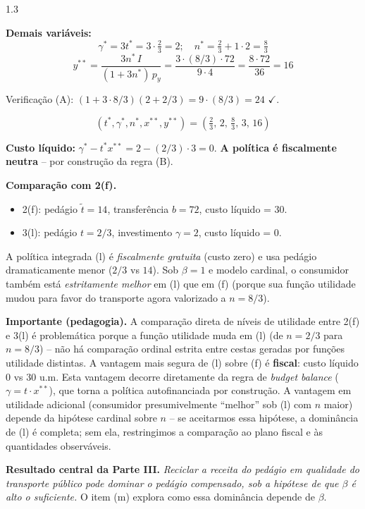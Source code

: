 \documentclass[11pt,addpoints]{exam}
\begin{document}
\begin{spacing}{1.3}
\begin{questions}
\begin{parts}
\begin{solution}
\textbf{Demais variáveis:}
\[
  \gamma^* = 3 t^* = 3\cdot \tfrac{2}{3} = 2; \quad n^* = \tfrac{2}{3} + 1\cdot 2 = \tfrac{8}{3}
\]
\[
  y^{**} = \frac{3 n^*\, I}{(1+3n^*)\, p_y} = \frac{3\cdot (8/3)\cdot 72}{9\cdot 4} = \frac{8\cdot 72}{36} = 16
\]

Verificação (A): $(1+3\cdot 8/3)(2 + 2/3) = 9\cdot (8/3) = 24$ $\checkmark$.

\[
  \boxed{(t^*, \gamma^*, n^*, x^{**}, y^{**}) = \left(\tfrac{2}{3},\,2,\,\tfrac{8}{3},\,3,\,16\right)}
\]

\textbf{Custo líquido:} $\gamma^* - t^* x^{**} = 2 - (2/3)\cdot 3 = 0$. \textbf{A política é fiscalmente neutra} -- por construção da regra (B).

\textbf{Comparação com 2(f).}
\begin{itemize}[noitemsep]
\item 2(f): pedágio $\tilde t = 14$, transferência $b=72$, custo líquido = 30.
\item 3(l): pedágio $t = 2/3$, investimento $\gamma=2$, custo líquido = 0.
\end{itemize}

A política integrada (l) é \textit{fiscalmente gratuita} (custo zero) e usa pedágio dramaticamente menor ($2/3$ vs $14$). Sob $\beta=1$ e modelo cardinal, o consumidor também está \textit{estritamente melhor} em (l) que em (f) (porque sua função utilidade mudou para favor do transporte agora valorizado a $n=8/3$).

\textbf{Importante (pedagogia).} A comparação direta de níveis de utilidade entre 2(f) e 3(l) é problemática porque a função utilidade muda em (l) (de $n=2/3$ para $n=8/3$) -- não há comparação ordinal estrita entre cestas geradas por funções utilidade distintas. A vantagem mais segura de (l) sobre (f) é \textbf{fiscal}: custo líquido 0 vs 30 u.m. Esta vantagem decorre diretamente da regra de \textit{budget balance} ($\gamma = t \cdot x^{**}$), que torna a política autofinanciada por construção. A vantagem em utilidade adicional (consumidor presumivelmente ``melhor'' sob (l) com $n$ maior) depende da hipótese cardinal sobre $n$ -- se aceitarmos essa hipótese, a dominância de (l) é completa; sem ela, restringimos a comparação ao plano fiscal e às quantidades observáveis.

\textbf{Resultado central da Parte III.} \emph{Reciclar a receita do pedágio em qualidade do transporte público pode dominar o pedágio compensado, sob a hipótese de que $\beta$ é alto o suficiente.} O item (m) explora como essa dominância depende de $\beta$.
\end{solution}


\end{parts}
\end{questions}
\end{spacing}
\end{document}
